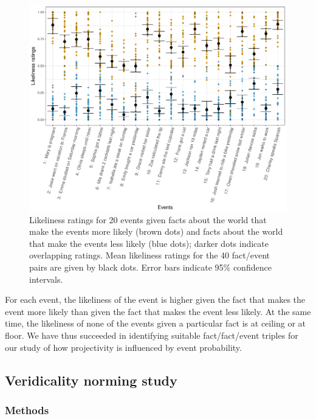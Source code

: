 \documentclass[11pt,fleqn]{article}
\newcommand{\6}{\mbox{$[\hspace*{-.6mm}[$}}
\newcommand{\9}{\mbox{$]\hspace*{-.6mm}]$}}
\begin{document}
\begin{figure}[h!]
\centering

\includegraphics[width=.8\paperwidth]{../results/1-prior/graphs/target-ratings}

\caption{Likeliness ratings for 20 events given facts about the world that make the events more likely (brown dots) and facts about the world that make the events less likely (blue dots); darker dots indicate overlapping ratings. Mean likeliness ratings for the 40 fact/event pairs are given by black dots. Error bars indicate 95\% confidence intervals.}\label{f-priors}
\end{figure}

For each event, the likeliness of the event is higher given the fact that makes the event more likely than given the fact that makes the event less likely. At the same time, the likeliness of none of the events given a particular fact is at ceiling or at floor. We have thus succeeded in identifying suitable fact/fact/event triples for our study of how projectivity is influenced by event probability.

\subsection{Veridicality norming study}\label{s-pretest2}

\subsubsection{Methods}\label{s-methods-2}
\end{document}
